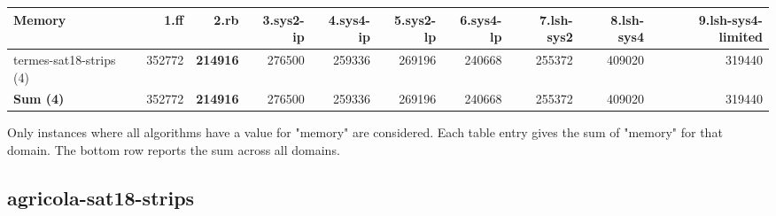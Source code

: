 \documentclass{article}
\newcommand{\numtasks}[1]{\small{(#1)}}
\begin{document}
\begin{tabular}{@{}lrrrrrrrrr@{}}
Memory & 1.ff & 2.rb & 3.sys2-ip & 4.sys4-ip & 5.sys2-lp & 6.sys4-lp & 7.lsh-sys2 & 8.lsh-sys4 & 9.lsh-sys4-limited \\
\midrule
termes-sat18-strips \numtasks{4} & 352772 & \textbf{214916} & 276500 & 259336 & 269196 & 240668 & 255372 & 409020 & 319440 \\
\textbf{Sum \numtasks{4}} & 352772 & \textbf{214916} & 276500 & 259336 & 269196 & 240668 & 255372 & 409020 & 319440 \\
\end{tabular}

Only instances where all algorithms have a value for "memory" are considered. Each table entry gives the sum of "memory" for that domain. The bottom row reports the sum across all domains.

\hypertarget{memory-agricola-sat18-strips}{}
\subsection*{agricola-sat18-strips}
\end{document}
